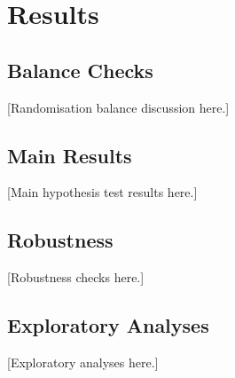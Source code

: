 \section{Results}

\subsection{Balance Checks}

[Randomisation balance discussion here.]

% 

\subsection{Main Results}

[Main hypothesis test results here.]



\subsection{Robustness}

[Robustness checks here.]

\subsection{Exploratory Analyses}

[Exploratory analyses here.]
